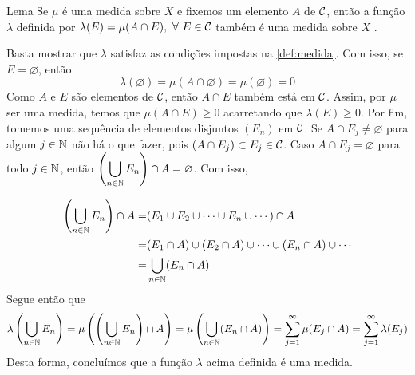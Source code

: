 \begin{env}{Lema}
	\label{lem:medida-da-intersecao-de-um-fixado}
	Se $\mu$ é uma medida sobre $X$ e fixemos um elemento $A$ de $\operatorname{\mathcal{C}}$, então a função $\lambda$ definida por $\lambda(E) = \mu(A\cap E), \ \forall\  E \in \cc$ também é uma medida sobre $X$ \cite{bartle}.
\end{env}
\begin{prova}
	Basta mostrar que $\lambda$ satisfaz as condições impostas na  \ref{def:medida}.
	Com isso, se $E = \varnothing$, então
	$$
	\lambda(\varnothing) = \mu(A \cap \varnothing) = \mu(\varnothing) = 0
	$$
	Como $A$ e $E$ são elementos de $\operatorname{\mathcal{C}}$, então $A \cap E$ também está em $\operatorname{\mathcal{C}}$.
	Assim, por $\mu$ ser uma medida, temos que $\mu(A\cap E) \geq 0$ acarretando que $\lambda(E) \geq 0$.
	Por fim, tomemos uma sequência de elementos disjuntos $(E_n)$ em $\operatorname{\mathcal{C}}$.
	Se $A \cap E_j \neq \varnothing$ para algum $j \in \operatorname{\mathbb{N}}$ 
	não há o que fazer, pois $(A \cap E_j) \subset E_j \in \operatorname{\mathcal{C}}$.
	Caso $A \cap E_j = \varnothing$ para todo $j \in \operatorname{\mathbb{N}}$, então $\displaystyle \left( \bigcup_{n \in \operatorname{\mathbb{N}}} E_n\right) \cap A = \varnothing$.
	Com isso, 
	
	\begin{align*}
		\left( \bigcup_{n \in \operatorname{\mathbb{N}}} E_n\right) \cap A
		= &
		(E_1 \cup E_2 \cup \cdots \cup E_n \cup \cdots) \cap A\\
		= &
		(E_1 \cap A )\cup (E_2 \cap A) \cup \cdots \cup (E_n\cap A) \cup \cdots \\
		= &
		\bigcup_{n \in \operatorname{\mathbb{N}}} (E_n\cap A)    
	\end{align*}
	Segue então que
	$$
	\lambda\left( \bigcup_{n \in \operatorname{\mathbb{N}}} E_n\right)
	=
	\mu\left(\left( \bigcup_{n \in \operatorname{\mathbb{N}}} E_n\right) \cap A\right)
	=
	\mu\left( \bigcup_{n \in \operatorname{\mathbb{N}}} (E_n\cap A) \right)
	=
	\sum_{j = 1}^\infty \mu(E_j \cap A)
	= 
	\sum_{j = 1}^\infty \lambda(E_j)
	$$
	Desta forma, concluímos que a função $\lambda$ acima definida é uma medida.
\end{prova}

